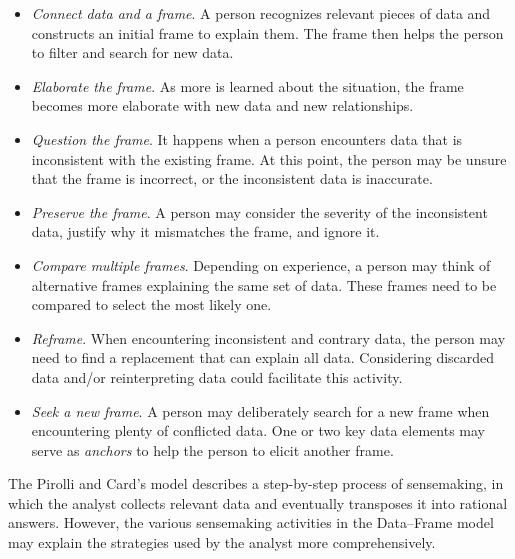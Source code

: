 \begin{itemize}
	\item \emph{Connect data and a frame}. A person recognizes relevant pieces of data and constructs an initial frame to explain them. The frame then helps the person to filter and search for new data.
	\item \emph{Elaborate the frame}. As more is learned about the situation, the frame becomes more elaborate with new data and new relationships. 
	\item \emph{Question the frame}. It happens when a person encounters data that is inconsistent with the existing frame. At this point, the person may be unsure that the frame is incorrect, or the inconsistent data is inaccurate.
	\item \emph{Preserve the frame}. A person may consider the severity of the inconsistent data, justify why it mismatches the frame, and ignore it.
	\item \emph{Compare multiple frames}. Depending on experience, a person may think of alternative frames explaining the same set of data. These frames need to be compared to select the most likely one.
	\item \emph{Reframe}. When encountering inconsistent and contrary data, the person may need to find a replacement that can explain all data. Considering discarded data and/or reinterpreting data could facilitate this activity.
	\item \emph{Seek a new frame}. A person may deliberately search for a new frame when encountering plenty of conflicted data. One or two key data elements may serve as \emph{anchors} to help the person to elicit another frame.
\end{itemize}

The Pirolli and Card's model describes a step-by-step process of sensemaking, in which the analyst collects relevant data and eventually transposes it into rational answers. However, the various sensemaking activities in the Data--Frame model may explain the strategies used by the analyst more comprehensively.